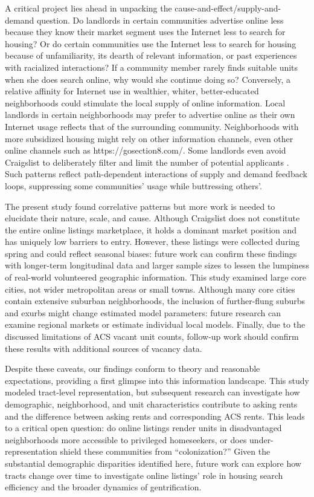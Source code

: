\documentclass[11pt,letterpaper]{article}
\begin{document}
A critical project lies ahead in unpacking the cause-and-effect/supply-and-demand question. Do landlords in certain communities advertise online less because they know their market segment uses the Internet less to search for housing? Or do certain communities use the Internet less to search for housing because of unfamiliarity, its dearth of relevant information, or past experiences with racialized interactions? If a community member rarely finds suitable units when she does search online, why would she continue doing so? Conversely, a relative affinity for Internet use in wealthier, whiter, better-educated neighborhoods could stimulate the local supply of online information. Local landlords in certain neighborhoods may prefer to advertise online as their own Internet usage reflects that of the surrounding community. Neighborhoods with more subsidized housing might rely on other information channels, even other online channels such as https://gosection8.com/. Some landlords even avoid Craigslist to deliberately filter and limit the number of potential applicants \citep{mendez_professional_2016}. Such patterns reflect path-dependent interactions of supply and demand feedback loops, suppressing some communities' usage while buttressing others'.

The present study found correlative patterns but more work is needed to elucidate their nature, scale, and cause. Although Craigslist does not constitute the entire online listings marketplace, it holds a dominant market position and has uniquely low barriers to entry. However, these listings were collected during spring and could reflect seasonal biases: future work can confirm these findings with longer-term longitudinal data and larger sample sizes to lessen the lumpiness of real-world volunteered geographic information. This study examined large core cities, not wider metropolitan areas or small towns. Although many core cities contain extensive suburban neighborhoods, the inclusion of further-flung suburbs and exurbs might change estimated model parameters: future research can examine regional markets or estimate individual local models. Finally, due to the discussed limitations of ACS vacant unit counts, follow-up work should confirm these results with additional sources of vacancy data.

Despite these caveats, our findings conform to theory and reasonable expectations, providing a first glimpse into this information landscape. This study modeled tract-level representation, but subsequent research can investigate how demographic, neighborhood, and unit characteristics contribute to asking rents and the difference between asking rents and corresponding ACS rents. This leads to a critical open question: do online listings render units in disadvantaged neighborhoods more accessible to privileged homeseekers, or does under-representation shield these communities from \enquote{colonization?} Given the substantial demographic disparities identified here, future work can explore how tracts change over time to investigate online listings' role in housing search efficiency and the broader dynamics of gentrification.
\end{document}
